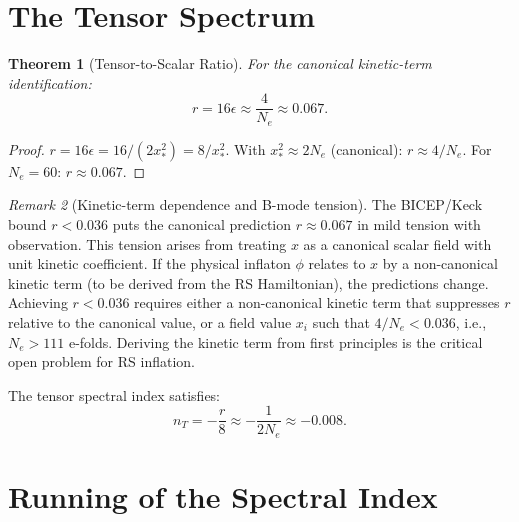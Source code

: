 \documentclass[12pt,a4paper]{article}
\newtheorem{theorem}{Theorem}[section]
\theoremstyle{definition}
\theoremstyle{remark}
\newtheorem{remark}[theorem]{Remark}
\begin{document}
\section{The Tensor Spectrum}
\label{sec:tensor}

\begin{theorem}[Tensor-to-Scalar Ratio]
\label{thm:r}
For the canonical kinetic-term identification:
\begin{equation}
  \boxed{r = 16\epsilon \approx \frac{4}{N_e}
  \approx 0.067.}
  \label{eq:r}
\end{equation}
\end{theorem}

\begin{proof}
$r = 16\epsilon = 16/(2x_*^2) = 8/x_*^2$.
With $x_*^2 \approx 2N_e$ (canonical): $r \approx 4/N_e$.
For $N_e = 60$: $r \approx 0.067$.
\end{proof}

\begin{remark}[Kinetic-term dependence and B-mode tension]
\label{rem:kinetic}
The BICEP/Keck bound $r < 0.036$ puts the canonical prediction
$r \approx 0.067$ in mild tension with observation.  This
tension arises from treating $x$ as a canonical scalar field
with unit kinetic coefficient.  If the physical inflaton $\phi$
relates to $x$ by a non-canonical kinetic term (to be derived
from the RS Hamiltonian), the predictions change.  Achieving
$r < 0.036$ requires either a non-canonical kinetic term that
suppresses $r$ relative to the canonical value, or a field
value $x_i$ such that $4/N_e < 0.036$, i.e., $N_e > 111$
e-folds.  Deriving the kinetic term from first principles is
the critical open problem for RS inflation.

\noindent The tensor spectral index satisfies:
\begin{equation}
  n_T = -\frac{r}{8} \approx -\frac{1}{2N_e}
  \approx -0.008.
\end{equation}
\end{remark}

\section{Running of the Spectral Index}
\label{sec:running}
\end{document}
